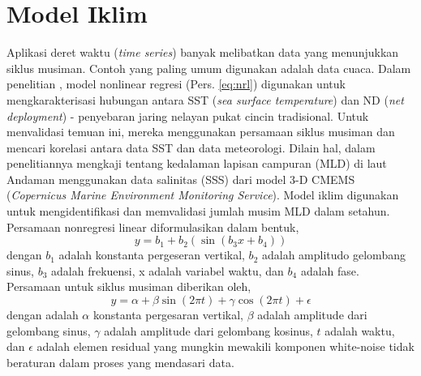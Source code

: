 \section[Model Iklim]{Model Iklim}
\begin{spacing}{1.5}
	Aplikasi deret waktu (\textit{time series}) banyak melibatkan data yang menunjukkan siklus musiman. Contoh yang paling umum digunakan adalah data cuaca. Dalam penelitian , model nonlinear regresi (Pers. \ref{eq:nrl}) digunakan untuk mengkarakterisasi hubungan antara SST (\textit{sea surface temperature}) dan ND (\textit{net deployment}) - penyebaran jaring nelayan pukat cincin tradisional. Untuk menvalidasi temuan ini, mereka menggunakan persamaan siklus musiman  dan mencari korelasi antara data SST dan data meteorologi. Dilain hal,  dalam penelitiannya mengkaji tentang kedalaman lapisan campuran (MLD) di laut Andaman menggunakan data salinitas (SSS) dari model 3-D CMEMS (\textit{Copernicus Marine Environment Monitoring Service}). Model iklim digunakan untuk mengidentifikasi dan memvalidasi jumlah musim MLD dalam setahun. Persamaan nonregresi linear diformulasikan dalam bentuk,
	\begin{equation}\label{eq:nrl}
		y = b_1 + b_2(\sin(b_3x+b_4))
	\end{equation}
	dengan $b_1$ adalah konstanta pergeseran vertikal, $b_2$ adalah amplitudo gelombang sinus, $b_3$ adalah frekuensi, x adalah variabel waktu, dan $b_4$ adalah fase.
	Persamaan untuk siklus musiman diberikan oleh,
	\begin{equation}
		y = \alpha + \beta \sin(2\pi t)+\gamma \cos(2\pi t) + \epsilon
	\end{equation}
	dengan adalah $\alpha$ konstanta pergesaran vertikal, $\beta$ adalah amplitude dari gelombang sinus, $\gamma$ adalah amplitude dari gelombang kosinus, $t$ adalah waktu, dan $\epsilon$ adalah elemen residual yang mungkin mewakili komponen white-noise tidak beraturan dalam proses yang mendasari data.
\end{spacing}
	

